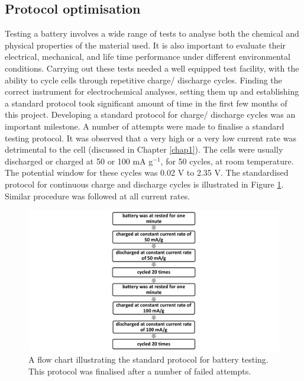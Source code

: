 \subsection*{Protocol optimisation}
Testing a battery involves a wide range of tests to analyse both the chemical and physical properties of the material used. It is also important to evaluate their electrical, mechanical, and life time performance under different environmental conditions.
Carrying out these tests needed a well equipped test facility, with the ability to cycle cells through repetitive charge/ discharge cycles. Finding the correct instrument for electrochemical analyses, setting them up and establishing a standard protocol took significant amount of time in the first few months of this project. Developing a standard protocol for charge/ discharge cycles was an important milestone. A number of attempts were made to finalise a standard testing protocol. It was observed that a very high or a very low current rate was detrimental to the cell (discussed in Chapter \ref{chap1}). The cells were usually discharged or charged at 50 or 100 mA g$^{-1}$, for 50 cycles, at room temperature. The potential window for these cycles was 0.02 V to 2.35 V. The standardised protocol for continuous charge and discharge cycles is illustrated in Figure \ref{Figures/chap3fig:flow}. Similar procedure was followed at all current rates.\\

\begin{figure}[tbh!]
\centering
\includegraphics[width=\textwidth]{Figures/chap3fig/flow.pdf}
\caption{A flow chart illustrating the standard protocol for battery testing. This protocol was finalised after a number of failed attempts.}
\label{Figures/chap3fig:flow}
\end{figure}

